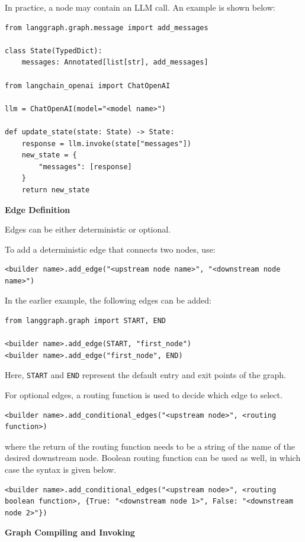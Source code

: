 In practice, a node may contain an LLM call. An example is shown below:
\begin{lstlisting}
from langgraph.graph.message import add_messages

class State(TypedDict):
    messages: Annotated[list[str], add_messages]
    
from langchain_openai import ChatOpenAI

llm = ChatOpenAI(model="<model name>")

def update_state(state: State) -> State:
    response = llm.invoke(state["messages"])
    new_state = {
        "messages": [response]
    }
    return new_state
\end{lstlisting}

\vspace{0.1in}
\noindent \textbf{Edge Definition}
\vspace{0.1in}

Edges can be either deterministic or optional. 

To add a deterministic edge that connects two nodes, use:
\begin{lstlisting}
<builder name>.add_edge("<upstream node name>", "<downstream node name>")
\end{lstlisting}

In the earlier example, the following edges can be added:
\begin{lstlisting}
from langgraph.graph import START, END

<builder name>.add_edge(START, "first_node")
<builder name>.add_edge("first_node", END)
\end{lstlisting}
Here, \texttt{START} and \texttt{END} represent the default entry and exit points of the graph.

For optional edges, a routing function is used to decide which edge to select.
\begin{lstlisting}
<builder name>.add_conditional_edges("<upstream node>", <routing function>)
\end{lstlisting}
where the return of the routing function needs to be a string of the name of the desired downstream node. Boolean routing function can be used as well, in which case the syntax is given below.
\begin{lstlisting}
<builder name>.add_conditional_edges("<upstream node>", <routing boolean function>, {True: "<downstream node 1>", False: "<downstream node 2>"})
\end{lstlisting}

\vspace{0.1in}
\noindent \textbf{Graph Compiling and Invoking}
\vspace{0.1in}

